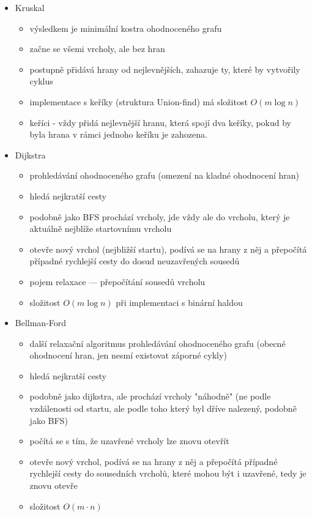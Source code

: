 \begin{itemize}
\begin{itemize}
		\item paměťová složitost $O(n + m)$, naivní implementace má časovou složitost $O(mn)$, implementace s použitím binárních minimových hald $O(m\log n)$
	\end{itemize}
	\item Kruskal
	\begin{itemize}
		\item výsledkem je minimální kostra ohodnoceného grafu
		\item začne se všemi vrcholy, ale bez hran
		\item postupně přidává hrany od nejlevnějších, zahazuje ty, které by vytvořily cyklus
		\item implementace s keříky (struktura Union-find) má složitost $O(m\log n)$
		\item keříci - vždy přidá nejlevnější hranu, která spojí dva keříky, pokud by byla hrana v rámci jednoho keříku je zahozena.
	\end{itemize}
	\item Dijkstra
	\begin{itemize}
		\item prohledávání ohodnoceného grafu (omezení na kladné ohodnocení hran)
		\item hledá nejkratší cesty
		\item podobně jako BFS prochází vrcholy, jde vždy ale do vrcholu, který je aktuálně nejblíže startovnímu vrcholu
		\item otevře nový vrchol (nejbližší startu), podívá se na hrany z něj a přepočítá případné rychlejší cesty do dosud neuzavřených sousedů
		\item pojem relaxace --- přepočítání sousedů vrcholu
		\item  složitost $O(m\log n)$ při implementaci s binární haldou
	\end{itemize}
	\item Bellman-Ford
	\begin{itemize}
		\item další relaxační algoritmus prohledávání ohodnoceného grafu (obecné ohodnocení hran, jen nesmí existovat záporné cykly)
		\item hledá nejkratší cesty
		\item podobně jako dijkstra, ale prochází vrcholy "náhodně" (ne podle vzdálenosti od startu, ale podle toho který byl dříve nalezený, podobně jako BFS)
		\item počítá se s tím, že uzavřené vrcholy lze znovu otevřít
		\item otevře nový vrchol, podívá se na hrany z něj a přepočítá případné rychlejší cesty do sousedních vrcholů, které mohou být i uzavřené, tedy je znovu otevře
		\item  složitost $O(m \cdot n)$
	\end{itemize}
\end{itemize}
